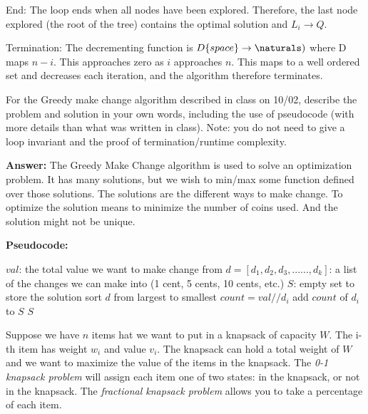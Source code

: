\documentclass{article}
\begin{document}
 End: The loop ends when all nodes have been explored. Therefore, the last node explored (the root of the tree) contains the optimal solution and $L_i \rightarrow Q$.
 
 Termination: The decrementing function is $D\{space\} \rightarrow \naturals)$ where D maps $n - i$. This approaches zero as $i$ approaches $n$. This maps to a well ordered set and decreases each iteration, and the algorithm therefore terminates.


\nextprob
For the Greedy make change algorithm described in class on 10/02, describe the
problem and solution in your own words, including the use of pseudocode (with
more details than what was written in class).  Note: you do not need to give a
loop invariant and the proof of termination/runtime complexity.

\textbf{Answer:} The Greedy Make Change algorithm is used to solve an optimization problem. It has many solutions, but we wish to min/max some function defined over those solutions. The solutions are the different ways to make change. To optimize the solution means to minimize the number of coins used. And the solution might not be unique.

\textbf{Pseudocode:}
\begin{algorithm}
            \begin{algorithmic}
            \State $val$: the total value we want to make change from
            \State $d = [d_1, d_2, d_3, ......, d_k]$: a list of the changes we can make into (1 cent, 5 cents, 10 cents, etc.)
                    \State $S$: empty set to store the solution
                    \State sort $d$ from largest to smallest
                        \State $count = val // d_i$
                        \State add $count$ of $d_i$ to $S$  
                    \EndFor
                    \newline
                    \Return $S$
                \EndFunction
            \end{algorithmic}
            \end{algorithm}


\nextprob
Suppose we have $n$ items hat we want to put in a knapsack of capacity $W$.  The i-th item has
weight $w_i$ and value $v_i$.  The knapsack can hold a total weight of $W$ and
we want to maximize the value of the items in the knapsack.
The \emph{0-1 knapsack problem} will assign each item one of two states: in the
knapsack, or not in the knapsack.  The \emph{fractional knapsack problem} allows
you to take a percentage of each item.
\end{document}
